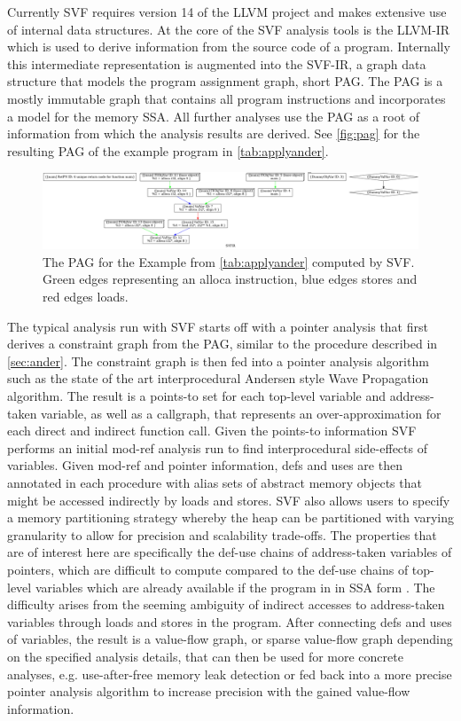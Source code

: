 Currently SVF requires version 14 of the LLVM project and makes extensive use of internal data structures.
At the core of the SVF analysis tools is the LLVM-IR which is used to derive information from the source code of a program. Internally this intermediate representation is augmented into the SVF-IR, a graph data structure that models the program assignment graph, short PAG. The PAG is a mostly immutable graph that contains all program instructions and incorporates a model for the memory SSA. All further analyses use the PAG as a root of information from which the analysis results are derived.
See \autoref{fig:pag} for the resulting PAG of the example program in \autoref{tab:applyander}.

\begin{figure}
    \centering
    \includegraphics[width=1.\textwidth]{img/pag.png}
    \caption{The PAG for the Example from \autoref{tab:applyander} computed by SVF.
        Green edges representing an alloca instruction, blue edges stores and red edges loads.}
    \label{fig:pag}
\end{figure}

The typical analysis run with SVF starts off with a pointer analysis that first derives a constraint graph from the PAG, similar to the procedure described in \autoref{sec:ander}.
The constraint graph is then fed into a pointer analysis algorithm such as the state of the art interprocedural Andersen style Wave Propagation algorithm.
The result is a points-to set for each top-level variable and address-taken variable, as well as a callgraph, that represents an over-approximation for each direct and indirect function call.
Given the points-to information SVF performs an initial mod-ref analysis run to find interprocedural side-effects of variables. Given mod-ref and pointer information, defs and uses are then annotated in each procedure with alias sets of abstract memory objects that might be accessed indirectly by loads and stores.
SVF also allows users to specify a memory partitioning strategy whereby the heap can be partitioned with varying granularity to allow for precision and scalability trade-offs.
The properties that are of interest here are specifically the def-use chains of address-taken variables of pointers, which are difficult to compute compared to the def-use chains of top-level variables which are already available if the program in in SSA form \cite{sui2016svf}.
The difficulty arises from the seeming ambiguity of indirect accesses to address-taken variables through loads and stores in the program.
After connecting defs and uses of variables, the result is a value-flow graph, or sparse value-flow graph depending on the specified analysis details, that can then be used for more concrete analyses, e.g. use-after-free memory leak detection \cite{sui2014detecting} or fed back into a more precise pointer analysis algorithm to increase precision with the gained value-flow information.

